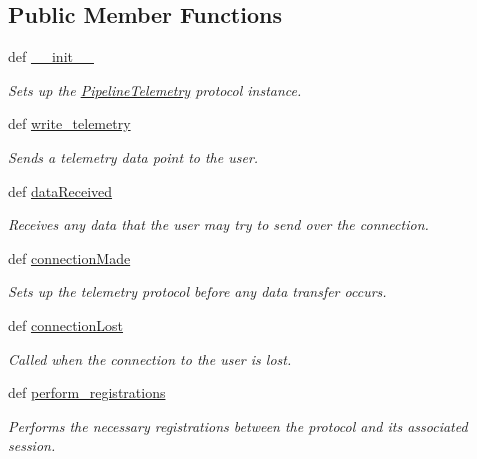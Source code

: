 \subsection*{Public Member Functions}
\begin{DoxyCompactItemize}
\item 
def \hyperlink{classhwm_1_1network_1_1protocols_1_1telemetry_1_1_pipeline_telemetry_a905edbf047171e13942d8e200b8b4bc7}{\-\_\-\-\_\-init\-\_\-\-\_\-}
\begin{DoxyCompactList}\small\item\em Sets up the \hyperlink{classhwm_1_1network_1_1protocols_1_1telemetry_1_1_pipeline_telemetry}{Pipeline\-Telemetry} protocol instance. \end{DoxyCompactList}\item 
def \hyperlink{classhwm_1_1network_1_1protocols_1_1telemetry_1_1_pipeline_telemetry_a1ed35df69655f6d92f0562bff4be28e1}{write\-\_\-telemetry}
\begin{DoxyCompactList}\small\item\em Sends a telemetry data point to the user. \end{DoxyCompactList}\item 
def \hyperlink{classhwm_1_1network_1_1protocols_1_1telemetry_1_1_pipeline_telemetry_af7bb78b3c184071f5824346a6beda2c5}{data\-Received}
\begin{DoxyCompactList}\small\item\em Receives any data that the user may try to send over the connection. \end{DoxyCompactList}\item 
def \hyperlink{classhwm_1_1network_1_1protocols_1_1telemetry_1_1_pipeline_telemetry_a3924681e40aab5ed413e40cd5031c9c4}{connection\-Made}
\begin{DoxyCompactList}\small\item\em Sets up the telemetry protocol before any data transfer occurs. \end{DoxyCompactList}\item 
\hypertarget{classhwm_1_1network_1_1protocols_1_1telemetry_1_1_pipeline_telemetry_acdec77591157f96c8e6886eab4656a71}{def \hyperlink{classhwm_1_1network_1_1protocols_1_1telemetry_1_1_pipeline_telemetry_acdec77591157f96c8e6886eab4656a71}{connection\-Lost}}\label{classhwm_1_1network_1_1protocols_1_1telemetry_1_1_pipeline_telemetry_acdec77591157f96c8e6886eab4656a71}

\begin{DoxyCompactList}\small\item\em Called when the connection to the user is lost. \end{DoxyCompactList}\item 
def \hyperlink{classhwm_1_1network_1_1protocols_1_1telemetry_1_1_pipeline_telemetry_a5196bc8e497f981644554fabb94472b9}{perform\-\_\-registrations}
\begin{DoxyCompactList}\small\item\em Performs the necessary registrations between the protocol and its associated session. \end{DoxyCompactList}\end{DoxyCompactItemize}

